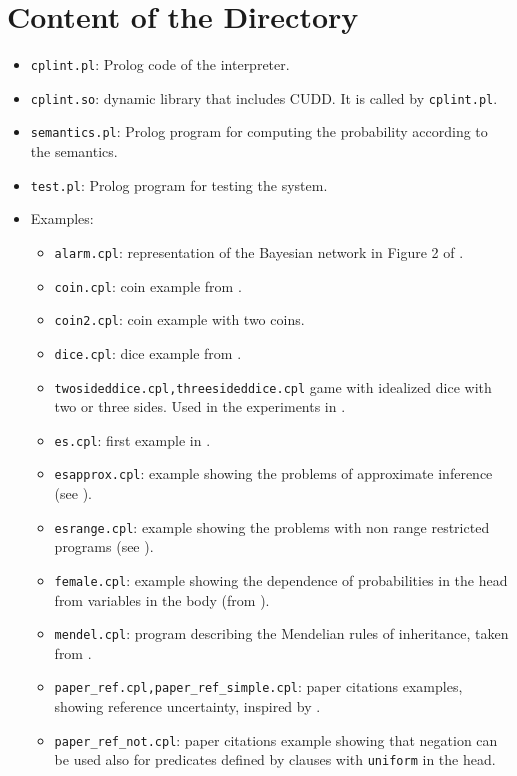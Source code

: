 \documentclass{article}
\begin{document}
\section{Content of the Directory}
\begin{itemize}
\item \texttt{cplint.pl}: Prolog code of the interpreter.
\item \verb|cplint.so|: dynamic library that includes  CUDD. It is called by \texttt{cplint.pl}.
\item \texttt{semantics.pl}: Prolog program for computing the probability according to the semantics.
\item \texttt{test.pl}: Prolog program for testing the system. 
\item Examples:
\begin{itemize}
\item \texttt{alarm.cpl}: representation of the Bayesian network in Figure 2 of
 \cite{VenVer04-ICLP04-IC}.
\item \texttt{coin.cpl}: coin example from   \cite{VenVer04-ICLP04-IC}.
\item \texttt{coin2.cpl}: coin example with two coins.
\item \texttt{dice.cpl}: dice example from \cite{VenVer04-ICLP04-IC}.
\item \verb|twosideddice.cpl,threesideddice.cpl|  game with idealized dice with two or three  sides. Used in the experiments in \cite{Rig-RCRA07-IC}.
\item \texttt{es.cpl}: first example in \cite{Rig-RCRA07-IC}.
\item \texttt{esapprox.cpl}: example showing the problems of approximate inference (see \cite{Rig-RCRA07-IC}).
\item \texttt{esrange.cpl}: example showing the problems with non range restricted programs (see \cite{Rig-RCRA07-IC}).
\item \texttt{female.cpl}: example showing the dependence of probabilities in the head from variables in the body (from \cite{VenVer04-ICLP04-IC}).
\item \texttt{mendel.cpl}: program describing the Mendelian rules of inheritance, taken from \cite{Blo04-ILP04WIP-IC}.
\item \verb|paper_ref.cpl,paper_ref_simple.cpl|: paper citations examples, showing reference uncertainty, inspired by \cite{Getoor+al:JMLR02}.
\item \verb|paper_ref_not.cpl|: paper citations example showing that negation can be used also for predicates defined by clauses with \texttt{uniform} in the head.

\end{itemize}
\end{itemize}
\end{document}
